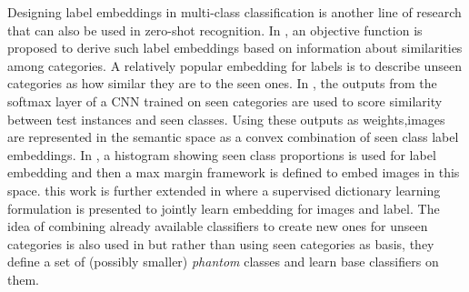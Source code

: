\documentclass[letterpaper]{article}
\begin{document}
Designing label embeddings in multi-class classification
is another line of research that can also be used in zero-shot recognition.
 In \cite{Yu2013}, an objective function is proposed to derive such label embeddings based on information about similarities among categories.
A relatively popular embedding for labels is to describe unseen categories as how similar they are to the seen ones.
In \cite{convex}, the outputs from the softmax layer of a CNN trained on seen categories are used to score similarity between test instances and seen classes.
Using these outputs as weights,images are represented in the semantic space as a convex combination of seen class label embeddings.
In \cite{sse}, a histogram showing seen class proportions is used for label embedding and then a max margin framework is defined to embed images in this space.
this work is further extended in \cite{agnostic} where a supervised dictionary learning formulation is
presented to jointly learn embedding for images and label.
%
 The idea of combining already available classifiers to create new ones for unseen categories is also used in \cite{Synthesized}
 but rather than using seen categories as basis, they define a set of (possibly smaller) \textit{phantom} classes and learn base classifiers on them.
\end{document}
